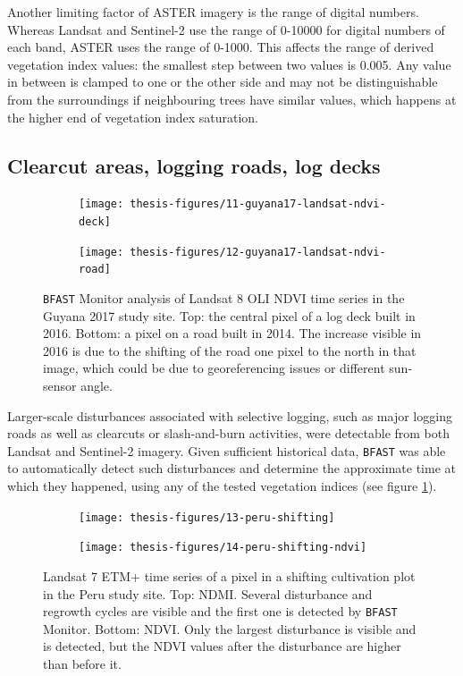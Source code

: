 \documentclass[a4paper,12pt]{scrbook}
\begin{document}
Another limiting factor of \ac{ASTER} imagery is the range of digital numbers. Whereas Landsat and Sentinel-2 use the range of 0-10000 for digital numbers of each band, \ac{ASTER} uses the range of 0-1000. This affects the range of derived vegetation index values: the smallest step between two values is 0.005. Any value in between is clamped to one or the other side and may not be distinguishable from the surroundings if neighbouring trees have similar values, which happens at the higher end of vegetation index saturation.

\subsection{Clearcut areas, logging roads, log decks}

\begin{figure}
  \begin{subfigure}{\textwidth}
    \centering
    \texttt{[image: thesis-figures/11-guyana17-landsat-ndvi-deck]}
  \end{subfigure}
  \begin{subfigure}{\textwidth}
    \centering
    \texttt{[image: thesis-figures/12-guyana17-landsat-ndvi-road]}
  \end{subfigure}
  \caption{\texttt{BFAST} Monitor analysis of Landsat 8 \ac{OLI} \ac{NDVI} time series in the Guyana 2017 study site. Top: the central pixel of a log deck built in 2016. Bottom: a pixel on a road built in 2014. The increase visible in 2016 is due to the shifting of the road one pixel to the north in that image, which could be due to georeferencing issues or different sun-sensor angle.}
  \label{fig-guyana17-landsat-ndvi-deck}
\end{figure}

Larger-scale disturbances associated with selective logging, such as major logging roads as well as clearcuts or slash-and-burn activities, were detectable from both Landsat and Sentinel-2 imagery. Given sufficient historical data, \texttt{BFAST} was able to automatically detect such disturbances and determine the approximate time at which they happened, using any of the tested vegetation indices (see figure \ref{fig-guyana17-landsat-ndvi-deck}).

\begin{figure}
  \begin{subfigure}{\textwidth}
    \centering
    \texttt{[image: thesis-figures/13-peru-shifting]}
  \end{subfigure}
  \begin{subfigure}{\textwidth}
    \centering
    \texttt{[image: thesis-figures/14-peru-shifting-ndvi]}
  \end{subfigure}
  \caption{Landsat 7 \ac{ETM+} time series of a pixel in a shifting cultivation plot in the Peru study site. Top: \ac{NDMI}. Several disturbance and regrowth cycles are visible and the first one is detected by \texttt{BFAST} Monitor. Bottom: \ac{NDVI}. Only the largest disturbance is visible and is detected, but the \ac{NDVI} values after the disturbance are higher than before it.}
  \label{fig-peru-shifting-cultivation}
\end{figure}
\end{document}
